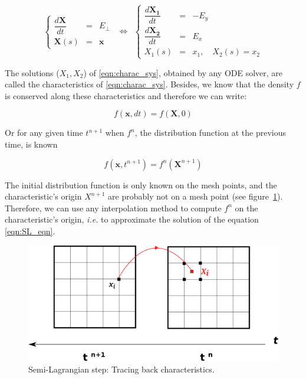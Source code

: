 \documentclass[proc]{edpsmath}
\begin{document}
\begin{equation}
	\label{eqn:charac_sys}
	\left\lbrace
	\begin{array}{lcl}
	\displaystyle \dfrac{d \mathbf{X}}{dt} &=& E_\perp\\[0.3cm]
	\displaystyle \mathbf{X}(s) &=& \mathbf{x}
	\end{array}\right.
~~\Longleftrightarrow ~~
	\left\lbrace
	\begin{array}{lcl}
	\displaystyle \dfrac{d \mathbf{X_1}}{dt} &=& -E_y\\[0.3cm]
	\displaystyle \dfrac{d \mathbf{X_2}}{dt} &=& E_x\\[0.3cm]
	\displaystyle X_1(s) &=& x_1, \quad   X_2(s) = x_2
	\end{array}\right.
\end{equation}

The solutions ($X_1, X_2$) of \eqref{eqn:charac_sys}, obtained by any ODE solver, are called the characteristics of \eqref{eqn:charac_sys}. Besides, we know that the density $f$ is conserved along these characteristics and therefore we can write:

\begin{equation}
	f(\mathbf{x}, dt) = f(\mathbf{X}, 0)
\end{equation}

Or for any given time $t^{n+1}$ when $f^n$, the distribution function at the previous time, is known

\begin{equation}
\label{eqn:SL_eqn}
	f(\mathbf{x}, t^{n+1}) = f^n(\mathbf{X}^{n+1})
\end{equation}

The initial distribution function is only known on the mesh points, and the characteristic's origin $X^{n+1}$ are probably not on a mesh point (see figure~\ref{fig:SL}). Therefore, we can use any interpolation method to compute $f^n$ on the characteristic's origin, \emph{i.e.} to approximate the solution of the equation \eqref{eqn:SL_eqn}.

\begin{figure}[h!]
	\label{fig:SL}
	\centering
	\includegraphics[scale=0.5]{figures/SL.png} 
	\caption{Semi-Lagrangian step: Tracing back characteristics.}
\end{figure}
\end{document}
